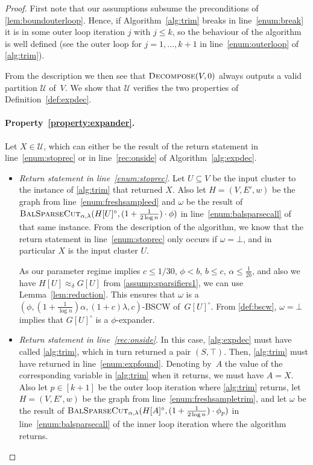 \documentclass[epsfig,letter,11pt]{article}
\numberwithin{equation}{section}
\newcommand{\bsc}{\textsc{BalSparseCut}_{\alpha,\lambda}}
\newcommand{\ed}{\textsc{Decompose}}
\begin{document}
\begin{proof}
	First note that our assumptions subsume the preconditions of \cref{lem:boundouterloop}. Hence, if Algorithm~\ref{alg:trim} breaks in line~\eqref{enum:break} it is in some outer loop iteration $j$ with $j \le k$, so the behaviour of the algorithm is well defined (see the outer loop for $j=1,\dots,k+1$ in line~\eqref{enum:outerloop} of \cref{alg:trim}).
	
	From the description we then see that $\ed(V,0)$ always outputs a valid partition $\mathcal{U}$ of~$V$. We show that $\mathcal{U}$ verifies the two properties of Definition~\ref{def:expdec}.
	
	\paragraph{Property~\eqref{property:expander}.} Let $X \in \mathcal{U}$, which can either be the result of the return statement in line~\eqref{enum:stoprec} or in line~\eqref{rec:onside} of Algorithm~\ref{alg:expdec}.
	\begin{itemize}
		\item \emph{Return statement in line~\eqref{enum:stoprec}}. Let $U \subseteq V$ be the input cluster to the  instance of \cref{alg:trim} that returned $X$. Also let $H=(V,E',w)$ be the graph from line~\eqref{enum:freshsampleed} and $\omega$ be the result of $\bsc(H[U]^\circ, (1+\frac{1}{2 \log n}) \cdot \phi)$ in line~\eqref{enum:balsparsecall} of that same instance. From the description of the algorithm, we know that the return statement in line~\eqref{enum:stoprec} only occurs if $\omega=\bot$, and in particular $X$ is the input cluster $U$.
		
		As our parameter regime implies $c \le 1/30$, $\phi < b$, $b \le c$, $\alpha \le \frac{1}{2b}$, and also we have $H[U] \approx_\delta G[U]$ from  \cref{assump:sparsifiers1}, we can use Lemma~\ref{lem:reduction}. This ensures that $\omega$ is a $(\phi,(1+\frac{1}{\log n})\alpha,(1+c)\lambda,c)$-BSCW of~$G[U]^\circ$. From \cref{def:bscw}, $\omega=\bot$ implies that $G[U]^\circ$ is a $\phi$-expander.
		
		\item \emph{Return statement in line~\eqref{rec:onside}}.  In this case, \cref{alg:expdec} must have called \cref{alg:trim}, which in turn returned a pair $(S,\top)$. Then, \cref{alg:trim} must have returned in line~\eqref{enum:expfound}. Denoting by~$A$ the value of the corresponding variable in \cref{alg:trim} when it returns, we must have $A=X$. Also let  $p \in [k+1]$ be the outer loop iteration where \cref{alg:trim} returns, let $H=(V,E',w)$ be the graph from line~\eqref{enum:freshsampletrim}, and let $\omega$ be the result of $\bsc(H[A]^\circ, (1+\frac{1}{2 \log n}) \cdot \phi_p)$ in line~\eqref{enum:balsparsecall} of the inner loop iteration where the algorithm returns.
		

\end{itemize}
\end{proof}
\end{document}
